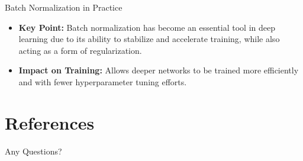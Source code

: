 \documentclass[serif, aspectratio=169]{beamer}
\begin{document}
\begin{frame}{Batch Normalization in Practice}
    
    \begin{itemize}

        \item \textbf{Key Point:} Batch normalization has become an essential tool in deep learning due to its ability to stabilize and accelerate training, while also acting as a form of regularization.
        \item \textbf{Impact on Training:} Allows deeper networks to be trained more efficiently and with fewer hyperparameter tuning efforts.

    \end{itemize}
\end{frame}


\section{References}

\begin{frame}[allowframebreaks]
    
    
    \nocite{*} %
\end{frame}


\begin{frame}
    \begin{center}
        {\Huge Any Questions?}
    \end{center}
\end{frame}
\end{document}
